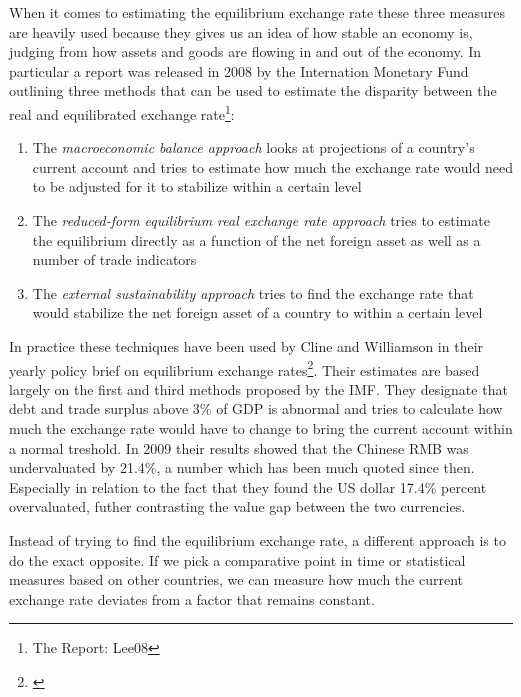 When it comes to estimating the equilibrium exchange rate these three 
measures are heavily used because they gives us an idea of how stable an 
economy is, judging from how assets and goods are flowing in and out of 
the economy. In particular a report was released in 2008 by the 
Internation Monetary Fund outlining three methods that can be used to 
estimate the disparity between the real and equilibrated exchange 
rate\footnote{The Report: \cite{pp.  1}{Lee08}}:

\begin{enumerate}
	\item{The \emph{macroeconomic balance approach} looks at projections 
		of a country's current account and tries to estimate how much 
	the exchange rate would need to be adjusted for it to stabilize 
within a certain level}
\item{The \emph{reduced-form equilibrium real exchange rate approach} 
	tries to estimate the equilibrium directly as a function of the net 
foreign asset as well as a number of trade indicators}
\item{The \emph{external sustainability approach} tries to find the 
	exchange rate that would stabilize the net foreign asset of a 
country to within a certain level}
\end{enumerate}

In practice these techniques have been used by Cline and Williamson in 
their yearly policy brief on equilibrium exchange 
rates\footnote{\cite{cline2009,cline2012}}.  Their estimates are based 
largely on the first and third methods proposed by the IMF. They 
designate that debt and trade surplus above 3\% of GDP is abnormal and 
tries to calculate how much the exchange rate would have to change to 
bring the current account within a normal treshold. In 2009 their 
results showed that the Chinese RMB was undervaluated by 21.4\%, a 
number which has been much quoted since then. Especially in relation to 
the fact that they found the US dollar 17.4\% percent overvaluated, 
futher contrasting the value gap between the two currencies.

% 
Instead of trying to find the equilibrium exchange rate, a different 
approach is to do the exact opposite. If we pick a comparative point in 
time or statistical measures based on other countries, we can measure 
how much the current exchange rate deviates from a factor that remains 
constant.

